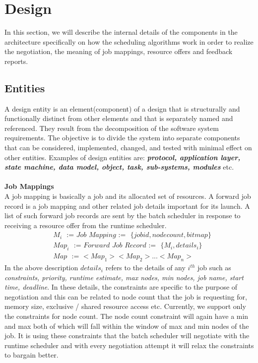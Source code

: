 \chapter{Design}
In this section, we will describe the internal details of the components in the architecture specifically on how the scheduling algorithms work in order to realize the negotiation, the meaning of job mappings, resource offers and feedback reports. 
\label{chapter:ischeduler}
\section{Entities}
A design entity is an element(component) of a design that is structurally and functionally distinct from other elements and that is separately named and referenced. They result from the decomposition of the software system requirements. The objective is to divide the system into separate components that can be considered, implemented, changed, and tested with minimal effect on other entities. Examples of design entities are: \textbf{\textit{protocol, application layer, state machine, data model, object, task, sub-systems, modules}} etc.\\ \\
\textbf{Job Mappings}\\
A job mapping is basically a job and its allocated set of resources. A forward job record is a job mapping and other related job details important for its launch. A list of such forward job records are sent by the batch scheduler in response to receiving a resource offer from the runtime scheduler.\\
\begin{equation*}
\begin{aligned}
&M_{i}\ \ \ \textit{:=\ \ \ Job Mapping\ \ \ :=}\ \ \ \{jobid,node count,bitmap\}\\
&Map_{i}\ \ \ \textit{:=\ \ \ Forward Job Record\ \ \ :=}\ \ \ \{M_{i},details_{i}\}\\
&Map\ \ \ \textit{:=\ \ \ {$<Map_{1}><Map_{2}>...<Map_{n}>$}}
\end{aligned}
\end{equation*}
In the above description $details_{i}$ refers to the details of any $i^{th}$ job such as \textit{constraints, priority, runtime estimate, max nodes, min nodes, job name, start time, deadline}. In these details, the constraints are specific to the purpose of negotiation and this can be related to node count that the job is requesting for, memory size, exclusive / shared resource access etc. Currently, we support only the constraints for node count. The node count constraint will again have a min and max both of which will fall within the window of max and min nodes of the job. It is using these constraints that the batch scheduler will negotiate with the runtime scheduler and with every negotiation attempt it will relax the constraints to bargain better.\\ \\
